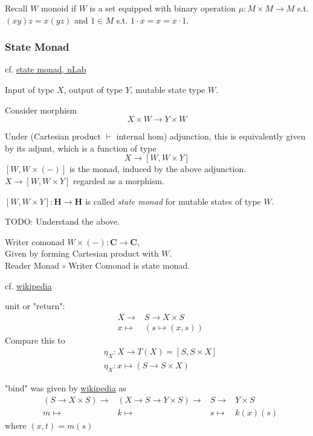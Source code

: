 \documentclass[10pt]{amsart}
\begin{document}
\begin{multicols*}{2}
Recall $W$ monoid if $W$ is a set equipped with binary operation $\mu : M \times M \to M$ s.t. $(xy)z = x(yz)$ and $1 \in M$ s.t. $1\cdot x = x = x \cdot 1$. \\

\subsubsection{State Monad}

cf. \href{https://ncatlab.org/nlab/show/state+monad}{state monad, nLab}

Input of type $X$, output of type $Y$, mutable state type $W$.

Consider morphism 
\[
X\times W \to Y\times W
\]

Under (Cartesian product $\vdash$ internal hom) adjunction, this is equivalently given by its adjunt, which is a function of type
\[
X \to [W, W\times Y]
\]
$[W, W\times (-)]$ is the monad, induced by the above adjunction. \\

$X \to [W, W\times Y]$ regarded as a morphism.

$[W, W\times Y]:\mathbf{H} \to \mathbf{H}$ is called \emph{state monad} for mutable states of type $W$.

TODO: Understand the above.

Writer comonad $W \times (-):\mathbf{C} \to \mathbf{C}$, \\

Given by forming Cartesian product with $W$. \\

Reader Monad $\circ$ Writer Comonad is state monad.

cf. \href{https://en.wikipedia.org/wiki/Monad_(functional_programming)#State_monads}{wikipedia}

unit or "return":
\begin{equation}\label{Eq:ReturnStateMonadWikipedia}
\begin{aligned}
& X \to & S \to X \times S \\
& x \mapsto & (s \mapsto (x, s))
\end{aligned}
\end{equation} 
Compare this to 
\[
\begin{aligned} 
	& \eta_X : X \to T(X) = [S, S \times X] \\ 
	& \eta_X : x \mapsto (S \to S \times X)
\end{aligned} 
\]

"bind" was given by \href{https://en.wikipedia.org/wiki/Monad_(functional_programming)#State_monads}{wikipedia} as 
\begin{equation}\label{Eq:BindStateMonadWikipedia}
\begin{aligned} 
	& (S \to X \times S)  \to & (X \to S \to Y \times S) \to & S \to & Y \times S \\ 
	& m \mapsto & k \mapsto & s \mapsto & k(x)(s) 
\end{aligned} 
\end{equation}
where $(x, t) = m(s)$


\end{multicols*}
\end{document}
